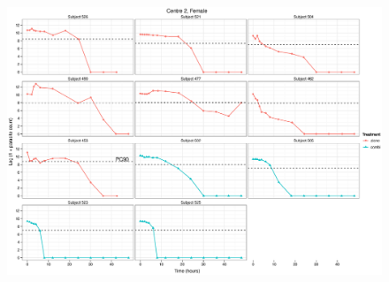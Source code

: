 \begin{singlespace}
\begin{figure}
\end{figure}
\begin{figure}
\centering
\includegraphics[height=150mm]{Araw2F.eps}
\end{figure}

\clearpage

\end{singlespace}
